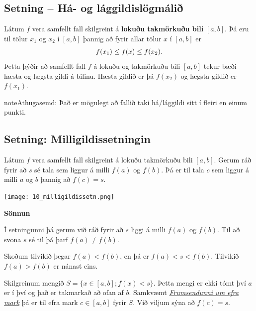 \documentclass[a4paper,10pt,icelandic]{sphinxmanual}
\begin{document}
\subsection{Setning – Há- og lággildislögmálið}
\label{kafli02:setning-ha-og-laggildislogmali}\label{kafli02:index-12}\label{kafli02:ha-og-laggildislogmali}
Látum \(f\) vera samfellt fall skilgreint á \textbf{lokuðu takmörkuðu bili}
\([a,b]\). Þá eru til tölur \(x_1\) og \(x_2\) í
\([a,b]\) þannig að fyrir allar tölur \(x\) í \([a,b]\) er
\begin{gather}
\begin{split}f(x_1)\leq f(x)\leq f(x_2).\end{split}\notag
\end{gather}
Þetta þýðir að samfellt fall \(f\) á lokuðu og takmörkuðu bili
\([a,b]\) tekur bæði hæsta og lægsta gildi á bilinu. Hæsta gildið er
þá \(f(x_2)\) og lægsta gildið er \(f(x_1)\).

\begin{notice}{note}{Athugasemd:}
Það er mögulegt að fallið taki há/lággildi sitt í fleiri en einum
punkti.
\end{notice}


\subsection{Setning: Milligildissetningin}
\label{kafli02:index-13}\label{kafli02:setning-milligildissetningin}
Látum \(f\) vera samfellt fall skilgreint á lokuðu takmörkuðu bili
\([a,b]\). Gerum ráð fyrir að \(s\) sé tala sem liggur á milli
\(f(a)\) og \(f(b)\). Þá er til tala \(c\) sem liggur á
milli \(a\) og \(b\) þannig að \(f(c)=s\).


\begin{center}
\texttt{[image: 10\_milligildissetn.png]}
\end{center}


\textbf{Sönnun}

Í setningunni þá gerum við ráð fyrir að \(s\) liggi á milli \(f(a)\) og
\(f(b)\). Til að svona \(s\) sé til þá þarf \(f(a) \neq f(b)\).

Skoðum tilvikið þegar \(f(a) < f(b)\), en þá er \(f(a) < s < f(b)\).
Tilvikið \(f(a)>f(b)\) er nánast eins.

Skilgreinum mengið \(S = \{ x \in [a,b] ; f(x) < s\}\). Þetta mengi er ekki tómt
því \(a\) er í því og það er takmarkað að ofan af \(b\). Samkvæmt
{\hyperref[kafli01:frumsendanumeframark]{\emph{Frumsendunni um efra mark}}} þá er til efra mark \(c \in[a,b]\)
fyrir \(S\). Við viljum sýna að \(f(c)=s\).
\end{document}
